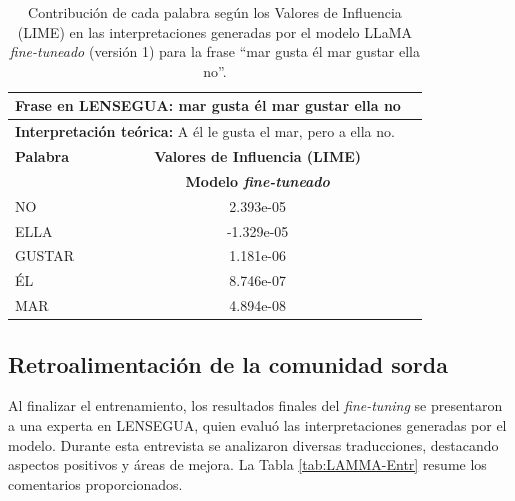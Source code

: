 \vspace{0.5cm}
\begin{table}[H]
\centering
    \begin{tabular}{|l|c|c|}
        \hline
        \multicolumn{2}{|l|}{\textbf{Frase en LENSEGUA:} mar gusta él mar gustar ella no} \\ \hline
        \multicolumn{2}{|l|}{\textbf{Interpretación teórica:} A él le gusta el mar, pero a ella no.} \\ \hline \hline
        
        \textbf{Palabra} & \multicolumn{1}{c|}{\textbf{Valores de Influencia (LIME)}} \\ 
        \cline{3-0} & \textbf{Modelo \textit{fine-tuneado}} \\
         
        \hline
        NO  & 2.393e-05  \\ \hline
        ELLA & -1.329e-05 \\
        \hline
        GUSTAR & 1.181e-06 \\
        \hline
        ÉL & 8.746e-07\\
        \hline 
        MAR & 4.894e-08\\
        \hline
        
    \end{tabular}
\caption{Contribución de cada palabra según los Valores de Influencia (LIME) en las interpretaciones generadas por el modelo LLaMA \textit{fine-tuneado} (versión 1) para la frase “mar gusta él mar gustar ella no”.}
\label{tab:LIME1-LLAMA3}
\end{table}





\subsection{Retroalimentación de la comunidad sorda}

Al finalizar el entrenamiento, los resultados finales del \textit{fine-tuning} se presentaron a una experta en LENSEGUA, quien evaluó las interpretaciones generadas por el modelo. Durante esta entrevista se analizaron diversas traducciones, destacando aspectos positivos y áreas de mejora. La Tabla \ref{tab:LAMMA-Entr} resume los comentarios proporcionados.

